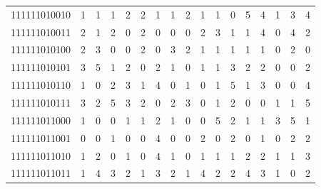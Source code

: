 \documentclass[10pt,a4paper]{article}
\begin{document}
\begin{longtable}{ |c|c|c|c|c|c|c|c|c|c|c|c|c|c|c|c|c| }
    111111010010              & 1                            & 1                                & 1                            & 2                              & 2   & 1   & 1   & 2   & 1   & 1   & 0   & 5   & 4   & 1   & 3   & 4   \\
    111111010011              & 2                            & 1                                & 2                            & 0                              & 2   & 0   & 0   & 0   & 2   & 3   & 1   & 1   & 4   & 0   & 4   & 2   \\
    111111010100              & 2                            & 3                                & 0                            & 0                              & 2   & 0   & 3   & 2   & 1   & 1   & 1   & 1   & 1   & 0   & 2   & 0   \\
    111111010101              & 3                            & 5                                & 1                            & 2                              & 0   & 2   & 1   & 0   & 1   & 1   & 3   & 2   & 2   & 0   & 0   & 2   \\
    111111010110              & 1                            & 0                                & 2                            & 3                              & 1   & 4   & 0   & 1   & 0   & 1   & 5   & 1   & 3   & 0   & 0   & 4   \\
    111111010111              & 3                            & 2                                & 5                            & 3                              & 2   & 0   & 2   & 3   & 0   & 1   & 2   & 0   & 0   & 1   & 1   & 5   \\
    111111011000              & 1                            & 0                                & 0                            & 1                              & 1   & 2   & 1   & 0   & 0   & 5   & 2   & 1   & 1   & 3   & 5   & 1   \\
    111111011001              & 0                            & 0                                & 1                            & 0                              & 0   & 4   & 0   & 0   & 2   & 0   & 2   & 0   & 1   & 0   & 2   & 2   \\
    111111011010              & 1                            & 2                                & 0                            & 1                              & 0   & 4   & 1   & 0   & 1   & 1   & 1   & 2   & 2   & 1   & 1   & 3   \\
    111111011011              & 1                            & 4                                & 3                            & 2                              & 1   & 3   & 2   & 1   & 4   & 2   & 2   & 4   & 3   & 1   & 0   & 2   \\

\end{longtable}
\end{document}
